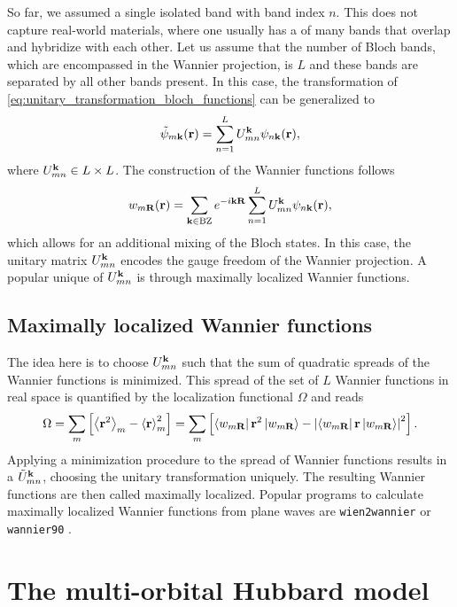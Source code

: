 \documentclass[\main/main.tex]{subfiles}
\begin{document}
So far, we assumed a single isolated band with band index $n$. This does not capture real-world materials, where one usually has a  of many bands that overlap and hybridize with each other. Let us assume that the number of Bloch bands, which are encompassed in the Wannier projection, is $L$ and these bands are separated by all other bands present. In this case, the transformation of \eqref{eq:unitary_transformation_bloch_functions} can be generalized to
\begin{align}
		\tilde{\psi}_{m\textbf{k}}(\textbf{r})=\sum_{n=1}^{L}U_{mn}^{\textbf{k}}\psi_{n\textbf{k}}(\textbf{r}),
\end{align}
where $U_{mn}^{\textbf{k}}\in L\times L$. The construction of the Wannier functions follows
\begin{align}
	w_{m\textbf{R}}(\textbf{r})=\sum_{\textbf{k}\in\text{BZ}}e^{-i\textbf{kR}}\sum_{n=1}^{L}U_{mn}^{\textbf{k}}\psi_{n\textbf{k}}(\textbf{r}),
\end{align}
which allows for an additional mixing of the Bloch states. In this case, the unitary matrix $U_{mn}^{\textbf{k}}$ encodes the gauge freedom of the Wannier projection. A popular unique  of $U_{mn}^{\textbf{k}}$ is through maximally localized Wannier functions.

\subsection{Maximally localized Wannier functions}\label{sec:maximally_localized_wannier_functions}

The idea here is to choose $U_{mn}^{\textbf{k}}$ such that the sum of quadratic spreads of the Wannier functions is minimized. This spread of the set of $L$ Wannier functions in real space is quantified by the localization functional $\Omega$ and reads
\begin{align}
	\Omega=\sum_m \left [\left\langle \textbf{r}^2\right\rangle_m-\left\langle \textbf{r}\right\rangle^2_m\right ]=\sum_m \left [\bra{w_{m\textbf{R}}} \textbf{r}^2 \ket{w_{m\textbf{R}}}-\left |\bra{w_{m\textbf{R}}} \textbf{r} \ket{w_{m\textbf{R}}}\right |^2\right ].
\end{align}
Applying a minimization procedure to the spread of Wannier functions results in a  $\tilde U_{mn}^{\textbf{k}}$, choosing the unitary transformation uniquely. The resulting Wannier functions are then called maximally localized. Popular programs to calculate maximally localized Wannier functions from plane waves are \texttt{wien2wannier} \cite{Kunes2010} or \texttt{wannier90} \cite{Mostofi2008}.

\section{The multi-orbital Hubbard model}\label{sec:multi_orbital_hubbard}
\end{document}
